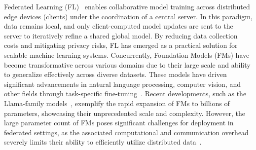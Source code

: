\documentclass[sigconf]{acmart}
\begin{document}
Federated Learning (FL)~\cite{mcmahan2017communication} enables collaborative model training across distributed edge devices (clients) under the coordination of a central server. In this paradigm, data remains local, and only client-computed model updates are sent to the server to iteratively refine a shared global model. By reducing data collection costs and mitigating privacy risks, FL has emerged as a practical solution for scalable machine learning systems. 
% 
Concurrently, Foundation Models (FMs) have become transformative across various domains due to their large scale and ability to generalize effectively across diverse datasets. These models have driven significant advancements in natural language processing, computer vision, and other fields through task-specific fine-tuning~\cite{touvron2023llama,dosovitskiy2020image}. Recent developments, such as the Llama-family models~\cite{touvron2023llama}, exemplify the rapid expansion of FMs to billions of parameters, showcasing their unprecedented scale and complexity. 
% 
However, the large parameter count of FMs poses significant challenges for deployment in federated settings, as the associated computational and communication overhead severely limits their ability to efficiently utilize distributed data~\cite{su2023fedra}. 

\end{document}
